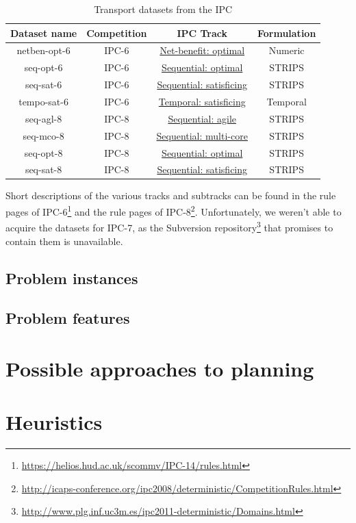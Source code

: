 \begin{table}[htb]
\begin{tabular}{c|c|c|c}
\textbf{Dataset name} & \textbf{Competition} & \textbf{IPC Track} & \textbf{Formulation} \\ 
\hline
\hline
netben-opt-6 & IPC-6 & \href{http://icaps-conference.org/ipc2008/deterministic/NetBenefitOptimization.html}{Net-benefit: optimal} & Numeric \\ 
seq-opt-6 & IPC-6 & \href{http://icaps-conference.org/ipc2008/deterministic/SequentialOptimization.html}{Sequential: optimal} & STRIPS \\ 
seq-sat-6 & IPC-6 & \href{http://icaps-conference.org/ipc2008/deterministic/SequentialSatisficing.html}{Sequential: satisficing} & STRIPS \\ 
tempo-sat-6 & IPC-6 & \href{http://icaps-conference.org/ipc2008/deterministic/TemporalSatisficing.html}{Temporal: satisficing} & Temporal \\ 
\hline
seq-agl-8 & IPC-8 & \href{https://helios.hud.ac.uk/scommv/IPC-14/seqagi.html}{Sequential: agile} & STRIPS \\ 
seq-mco-8 & IPC-8 & \href{https://helios.hud.ac.uk/scommv/IPC-14/seqmulti.html}{Sequential: multi-core} & STRIPS \\ 
seq-opt-8 & IPC-8 & \href{https://helios.hud.ac.uk/scommv/IPC-14/seqopt.html}{Sequential: optimal} & STRIPS \\ 
seq-sat-8 & IPC-8 & \href{https://helios.hud.ac.uk/scommv/IPC-14/seqsat.html}{Sequential: satisficing} & STRIPS \\ 
\end{tabular}
\caption{Transport datasets from the IPC}
\label{tab:ipc-datasets}
\end{table}

Short descriptions of the various tracks and subtracks can be found in the rule pages of IPC-6\footnote{\url{https://helios.hud.ac.uk/scommv/IPC-14/rules.html}}
and the rule pages of IPC-8\footnote{\url{http://icaps-conference.org/ipc2008/deterministic/CompetitionRules.html}}.
Unfortunately, we weren't able to acquire the datasets for IPC-7, as the Subversion repository\footnote{\url{http://www.plg.inf.uc3m.es/ipc2011-deterministic/Domains.html}} that promises to contain them is unavailable.

\subsection{Problem instances}


\subsection{Problem features}



\section{Possible approaches to planning}


\section{Heuristics}



